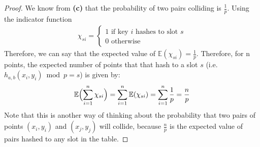 \documentclass[11pt]{article}
\begin{document}
\begin{enumerate}
\begin{enumerate}
\begin{proof}
We know from \textbf{(c)} that the probability of two pairs colliding is $\frac{1}{p}$.  Using the indicator function 
\begin{align*}
\chi_{si} = 
\begin{cases}
1 \text{ if key } i \text{ hashes to slot } s \\
0 \text{  otherwise} 
\end{cases}
\end{align*}
Therefore, we can say that the expected value of $\mathbb{E}(\chi_{si}) = \frac{1}{p}$.  Therefore, for n points, the expected number of points that that hash to a slot $s$ (i.e. $h_{a,b}(x_i,y_i)\bmod p= s$) is given by:
\begin{align*}
\mathbb{E}\Bigl(\sum_{i=1}^n \chi_{si}\Bigr) = \sum_{i=1}^n \mathbb{E}(\chi_{si})= \sum_{i=1}^n \frac{1}{p} = \frac{n}{p}
\end{align*}
Note that this is another way of thinking about the probability that two pairs of points $(x_i,y_i)$ and $(x_j,y_j)$ will collide, because $\frac{n}{p}$ is the expected value of pairs hashed to any slot in the table.
\end{proof}
\end{enumerate}
\end{enumerate}
\end{document}
